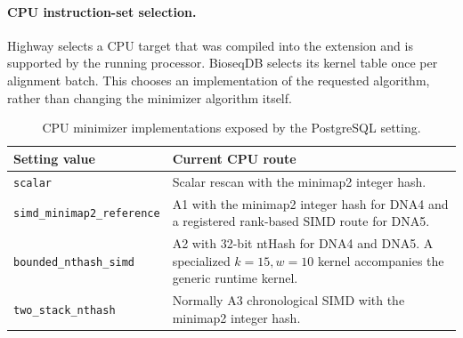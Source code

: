 \paragraph{CPU instruction-set selection.}
\label{sec:minimizer-hardware-selection}
Highway selects a CPU target that was compiled into the extension and is
supported by the running processor. BioseqDB selects its kernel table once
per alignment batch. This chooses an implementation of the requested
algorithm, rather than changing the minimizer algorithm itself.

\begin{table}[H]
  \centering
  \small
  \begin{tabularx}{\linewidth}{@{}p{.37\linewidth}X@{}}
    \toprule
    \textbf{Setting value} & \textbf{Current CPU route} \\
    \midrule
    \texttt{scalar}
      & Scalar rescan with the minimap2 integer hash. \\
    \texttt{simd\_minimap2\_reference}
      & A1 with the minimap2 integer hash for DNA4 and a registered
        rank-based SIMD route for DNA5. \\
    \texttt{bounded\_nthash\_simd}
      & A2 with 32-bit ntHash for DNA4 and DNA5. A specialized
        $k=15,w=10$ kernel accompanies the generic runtime kernel. \\
    \texttt{two\_stack\_nthash}
      & Normally A3 chronological SIMD with the minimap2 integer hash. \\
    \bottomrule
  \end{tabularx}
  \caption{CPU minimizer implementations exposed by the PostgreSQL setting.}
  \label{tab:current-cpu-minimizers}
\end{table}


